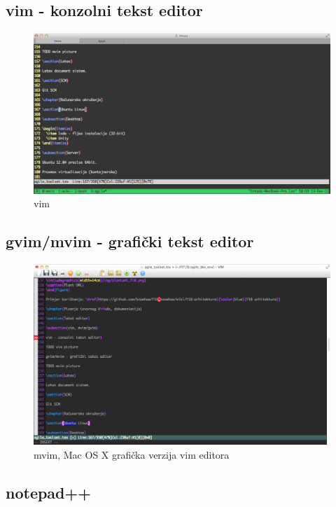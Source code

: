 \documentclass[times, utf8, seminar]{fit}
\begin{document}
\subsection{vim - konzolni tekst editor}

\begin{figure}[H]
\centering
\includegraphics[width=14cm]{img/vim.png}
\caption{vim}
\end{figure}

\subsection{gvim/mvim - grafički tekst editor}

\begin{figure}[H]
\centering
\includegraphics[width=14cm]{img/mvim.png}
\caption{mvim, Mac OS X grafička verzija vim editora}
\end{figure}

\subsection{notepad++}
\end{document}
